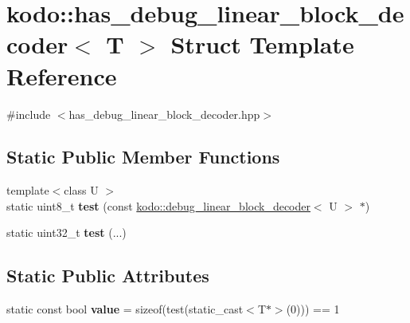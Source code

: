 \hypertarget{structkodo_1_1has__debug__linear__block__decoder}{\section{kodo\-:\-:has\-\_\-debug\-\_\-linear\-\_\-block\-\_\-decoder$<$ T $>$ Struct Template Reference}
\label{structkodo_1_1has__debug__linear__block__decoder}
}


{\ttfamily \#include $<$has\-\_\-debug\-\_\-linear\-\_\-block\-\_\-decoder.\-hpp$>$}

\subsection*{Static Public Member Functions}
\begin{DoxyCompactItemize}
\item 
\hypertarget{structkodo_1_1has__debug__linear__block__decoder_a3ae995dace30ace230fe7f7979be8215}{{\footnotesize template$<$class U $>$ }\\static uint8\-\_\-t {\bfseries test} (const \hyperlink{classkodo_1_1debug__linear__block__decoder}{kodo\-::debug\-\_\-linear\-\_\-block\-\_\-decoder}$<$ U $>$ $\ast$)}\label{structkodo_1_1has__debug__linear__block__decoder_a3ae995dace30ace230fe7f7979be8215}

\item 
\hypertarget{structkodo_1_1has__debug__linear__block__decoder_a69e916815795bde2cf99b36dc2e6bef4}{static uint32\-\_\-t {\bfseries test} (...)}\label{structkodo_1_1has__debug__linear__block__decoder_a69e916815795bde2cf99b36dc2e6bef4}

\end{DoxyCompactItemize}
\subsection*{Static Public Attributes}
\begin{DoxyCompactItemize}
\item 
\hypertarget{structkodo_1_1has__debug__linear__block__decoder_ab7b110a839fbe2281dd4c49d42df6752}{static const bool {\bfseries value} = sizeof(test(static\-\_\-cast$<$T$\ast$$>$(0))) == 1}\label{structkodo_1_1has__debug__linear__block__decoder_ab7b110a839fbe2281dd4c49d42df6752}

\end{DoxyCompactItemize}


